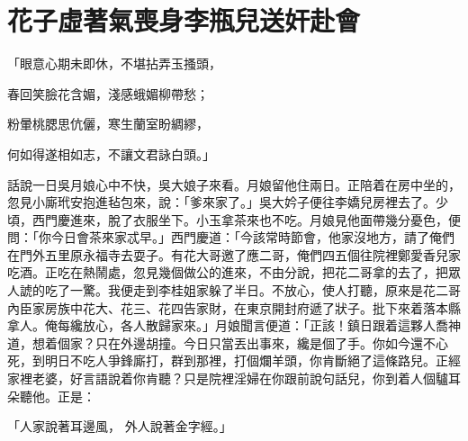 %

\chapter{花子虛著氣喪身\KG 李瓶兒送奸赴會}

「眼意心期未即休，不堪拈弄玉搔頭，

春回笑臉花含媚，淺感蛾媚柳帶愁；

粉暈桃腮思伉儷，寒生蘭室盼綢繆，

何如得遂相如志，不讓文君詠白頭。」

話說一日吳月娘心中不快，吳大娘子來看。月娘留他住兩日。正陪着在房中坐的，忽見小廝玳安抱進毡包來，說：「爹來家了。」吳大妗子便往李嬌兒房裡去了。少頃，西門慶進來，脫了衣服坐下。小玉拿茶來也不吃。月娘見他面帶幾分憂色，便問：「你今日會茶來家忒早。」西門慶道：「今該常時節會，他家沒地方，請了俺們在門外五里原永福寺去耍子。有花大哥邀了應二哥，俺們四五個往院裡鄭愛香兒家吃酒。正吃在熱鬧處，忽見幾個做公的進來，不由分說，把花二哥拿的去了，把眾人諕的吃了一驚。我便走到李桂姐家躲了半日。不放心，使人打聽，原來是花二哥內臣家房族中花大、花三、花四告家財，在東京開封府遞了狀子。批下來着落本縣拿人。俺每纔放心，各人散歸家來。」月娘聞言便道：「正該！鎮日跟着這夥人喬神道，想着個家？只在外邊胡撞。今日只當丟出事來，纔是個了手。你如今還不心死，到明日不吃人爭鋒廝打，群到那裡，打個爛羊頭，你肯斷絕了這條路兒。正經家裡老婆，好言語說着你肯聽？只是院裡淫婦在你跟前說句話兒，你到着人個驢耳朵聽他。正是：

「人家說著耳邊風，  外人說著金字經。」

